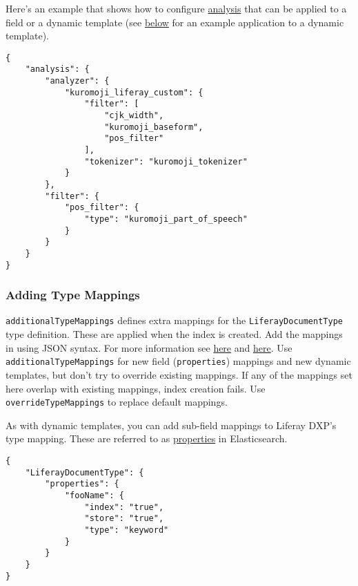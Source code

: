 Here's an example that shows how to configure
\href{https://www.elastic.co/guide/en/elasticsearch/guide/current/analysis-intro.html\#analysis-intro}{analysis}
that can be applied to a field or a dynamic template (see
\hyperref[overriding-type-mappings]{below} for an example application to
a dynamic template).

\begin{verbatim}
{  
    "analysis": {
        "analyzer": {
            "kuromoji_liferay_custom": {
                "filter": [
                    "cjk_width",
                    "kuromoji_baseform",
                    "pos_filter"
                ],
                "tokenizer": "kuromoji_tokenizer"
            }
        },
        "filter": {
            "pos_filter": {
                "type": "kuromoji_part_of_speech"
            }
        }
    }
}
\end{verbatim}

\subsubsection{Adding Type Mappings}\label{adding-type-mappings}

\texttt{additionalTypeMappings} defines extra mappings for the
\texttt{LiferayDocumentType} type definition. These are applied when the
index is created. Add the mappings in using JSON syntax. For more
information see
\href{https://www.elastic.co/guide/en/elasticsearch/reference/6.5/mapping.html}{here}
and
\href{https://www.elastic.co/guide/en/elasticsearch/reference/6.5/indices-put-mapping.html}{here}.
Use \texttt{additionalTypeMappings} for new field (\texttt{properties})
mappings and new dynamic templates, but don't try to override existing
mappings. If any of the mappings set here overlap with existing
mappings, index creation fails. Use \texttt{overrideTypeMappings} to
replace default mappings.

As with dynamic templates, you can add sub-field mappings to Liferay
DXP's type mapping. These are referred to as
\href{https://www.elastic.co/guide/en/elasticsearch/reference/6.5/properties.html}{properties}
in Elasticsearch.

\begin{verbatim}
{ 
    "LiferayDocumentType": {  
        "properties": {   
            "fooName": {
                "index": "true",
                "store": "true",
                "type": "keyword"
            }
        }   
    }
}
\end{verbatim}

